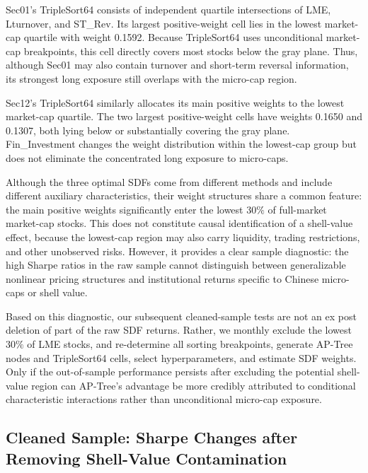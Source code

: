 \documentclass[12pt]{article}
\begin{document}
Sec01's TripleSort64 consists of independent quartile intersections of LME, Lturnover, and ST\_Rev. Its largest positive-weight cell lies in the lowest market-cap quartile with weight 0.1592. Because TripleSort64 uses unconditional market-cap breakpoints, this cell directly covers most stocks below the gray plane. Thus, although Sec01 may also contain turnover and short-term reversal information, its strongest long exposure still overlaps with the micro-cap region.

Sec12's TripleSort64 similarly allocates its main positive weights to the lowest market-cap quartile. The two largest positive-weight cells have weights 0.1650 and 0.1307, both lying below or substantially covering the gray plane. Fin\_Investment changes the weight distribution within the lowest-cap group but does not eliminate the concentrated long exposure to micro-caps.

Although the three optimal SDFs come from different methods and include different auxiliary characteristics, their weight structures share a common feature: the main positive weights significantly enter the lowest \(30\%\) of full-market market-cap stocks. This does not constitute causal identification of a shell-value effect, because the lowest-cap region may also carry liquidity, trading restrictions, and other unobserved risks. However, it provides a clear sample diagnostic: the high Sharpe ratios in the raw sample cannot distinguish between generalizable nonlinear pricing structures and institutional returns specific to Chinese micro-caps or shell value.

Based on this diagnostic, our subsequent cleaned-sample tests are not an ex post deletion of part of the raw SDF returns. Rather, we monthly exclude the lowest \(30\%\) of LME stocks, and re-determine all sorting breakpoints, generate AP-Tree nodes and TripleSort64 cells, select hyperparameters, and estimate SDF weights. Only if the out-of-sample performance persists after excluding the potential shell-value region can AP-Tree's advantage be more credibly attributed to conditional characteristic interactions rather than unconditional micro-cap exposure.

\subsection{Cleaned Sample: Sharpe Changes after Removing Shell-Value Contamination}
\label{subsec:cleaned_sample}
\end{document}

